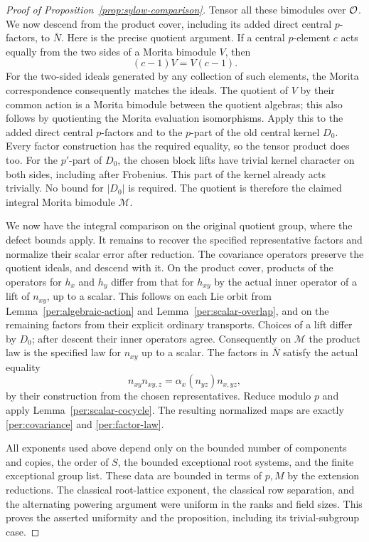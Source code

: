 \begin{proof}[Proof of Proposition~\ref{prop:sylow-comparison}]
Tensor all these bimodules over $\mathcal O$.  We now descend from the
product cover, including its added direct central $p$-factors, to
$\bar N$.  Here is the precise quotient argument.  If a central
$p$-element $c$ acts equally from the two sides of a Morita bimodule
$V$, then
\[
 (c-1)V=V(c-1).
\]
For the two-sided ideals generated by any collection of such
elements, the Morita correspondence consequently matches the
ideals.  The quotient of $V$ by their common action is a Morita
bimodule between the quotient algebras; this also follows by
quotienting the Morita evaluation isomorphisms.  Apply this to the
added direct central $p$-factors and to the $p$-part of the old
central kernel $D_0$.  Every factor construction has the required
equality, so the tensor product does too.  For the $p'$-part of
$D_0$, the chosen block lifts have trivial kernel character on both
sides, including after Frobenius.  This part of the kernel already
acts trivially.  No bound for $|D_0|$ is required.  The quotient is
therefore the claimed integral Morita bimodule $\mathcal M$.

We now have the integral comparison on the original quotient
group, where the defect bounds apply.  It remains to recover the
specified representative factors and normalize their scalar error
after reduction.
The covariance operators preserve the quotient ideals, and descend
with it.  On the product cover, products of the operators for $h_x$
and $h_y$ differ from that for $h_{xy}$ by the actual inner operator
of a lift of $n_{xy}$, up to a scalar.  This follows on each Lie
orbit from Lemma~\ref{per:algebraic-action} and
Lemma~\ref{per:scalar-overlap}, and on the remaining factors from
their explicit ordinary transports.  Choices of a lift differ by
$D_0$; after descent their inner operators agree.  Consequently on
$\mathcal M$ the product law is the specified law for $n_{xy}$ up
to a scalar.  The factors in $\bar N$ satisfy the actual equality
\[
 n_{xy}n_{xy,z}=\alpha_x(n_{yz})n_{x,yz},
\]
by their construction from the chosen representatives.  Reduce
modulo $p$ and apply Lemma~\ref{per:scalar-cocycle}.  The resulting
normalized maps are exactly \eqref{per:covariance} and
\eqref{per:factor-law}.

All exponents used above depend only on the bounded number of
components and copies, the order of $S$, the bounded exceptional
root systems, and the finite exceptional group list.  These data
are bounded in terms of $p,M$ by the extension reductions.
The classical root-lattice exponent, the classical row separation,
and the alternating powering argument were uniform in the ranks
and field sizes.  This proves the asserted uniformity and the
proposition, including its trivial-subgroup case.
\end{proof}

